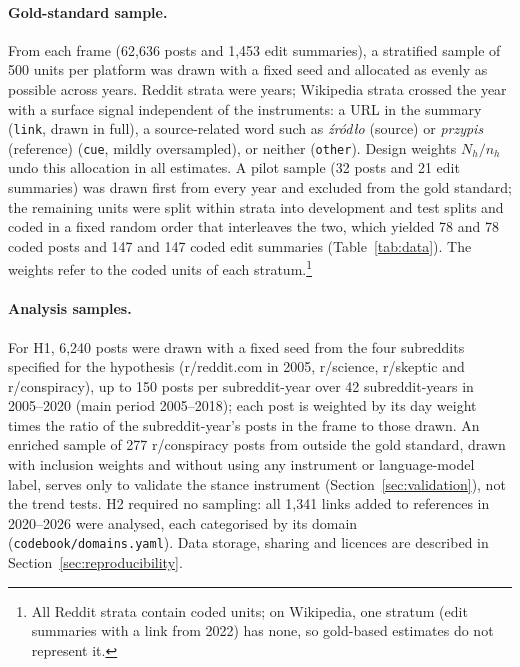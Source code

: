 \documentclass[10pt,a4paper]{article}
\newcommand{\kod}[1]{\texttt{#1}}
\newcommand{\szeroka}[1]{\resizebox{\linewidth}{!}{}}
\begin{document}
\paragraph{Gold-standard sample.}
From each frame (62,636 posts and 1,453 edit summaries), a
stratified sample of 500 units per platform was drawn with a fixed seed and allocated as
evenly as possible across years. Reddit strata were years; Wikipedia strata crossed the
year with a surface signal independent of the instruments: a URL in the summary
(\kod{link}, drawn in full), a source-related word such as \emph{źródło} (source) or
\emph{przypis} (reference) (\kod{cue}, mildly oversampled), or neither (\kod{other}).
Design weights $N_h/n_h$ undo this allocation in all estimates. A pilot sample
(32 posts and 21 edit summaries) was drawn first from every
year and excluded from the gold standard; the remaining units were split within strata
into development and test splits and coded in a fixed random order that interleaves the
two, which yielded 78 and 78 coded posts and
147 and 147 coded edit summaries
(Table~\ref{tab:data}). The weights refer to the coded units of each
stratum.\footnote{All Reddit strata contain coded units; on Wikipedia, one stratum (edit
summaries with a link from 2022) has none, so gold-based estimates do not represent it.}

\paragraph{Analysis samples.}
For H1, 6,240 posts were drawn with a fixed seed from the four subreddits
specified for the hypothesis (r/reddit.com in 2005, r/science, r/skeptic and
r/conspiracy), up to 150 posts per subreddit-year over 42 subreddit-years in 2005--2020
(main period 2005--2018); each post is weighted by its day weight times the ratio of the
subreddit-year's posts in the frame to those drawn. An enriched sample of
277 r/conspiracy posts from outside the gold standard, drawn with inclusion
weights and without using any instrument or language-model label, serves only to validate
the stance instrument (Section~\ref{sec:validation}), not the trend tests.
H2 required no sampling: all 1,341 links added to references in 2020--2026 were
analysed, each categorised by its domain (\kod{codebook/domains.yaml}). Data storage,
sharing and licences are described in Section~\ref{sec:reproducibility}.

\begin{table}[htbp]
\centering
\caption{Sampling frames, gold-standard sample and annotator agreement in the pilot.}
\label{tab:data}
\szeroka{preprint_data}
\end{table}
\end{document}
